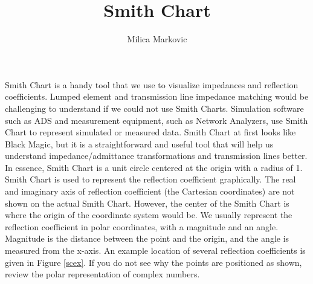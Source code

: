 \documentclass{ximera}
\title{Smith Chart}
\author{Milica Markovic}
\begin{document}
  
\begin{abstract}  

\end{abstract}  
\maketitle    







Smith Chart is a handy tool that we use to visualize impedances and reflection coefficients. Lumped element and transmission line impedance matching would be challenging to understand if we could not use Smith Charts. Simulation software such as ADS and measurement equipment, such as Network Analyzers, use Smith Chart to represent simulated or measured data.   Smith Chart at first looks like Black Magic, but it is a straightforward and useful tool that will help us understand impedance/admittance transformations and transmission lines better. In essence, Smith Chart is a unit circle centered at the origin with a radius of 1. Smith Chart is used to represent the reflection coefficient graphically. The real and imaginary axis of reflection coefficient (the Cartesian coordinates) are not shown on the actual Smith Chart. However, the center of the Smith Chart is where the origin of the coordinate system would be. We usually represent the reflection coefficient in polar coordinates, with a
magnitude and an angle. Magnitude is the distance between the point and the origin, and the angle is measured from the x-axis. 
 An example location of several reflection coefficients is given in Figure \ref{scex}. If you do not see why the points are positioned as shown, review the polar representation of complex numbers.
\end{document}
